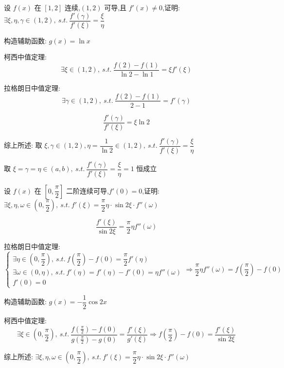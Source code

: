 \begin{proposition}
	设 $f(x)$ 在 $[1,2]$ 连续,$(1,2)$ 可导,且 $f'(x)\neq 0$,证明: $\exists \xi,\eta,\gamma\in(1,2),\ s.t.\ \dfrac{f'(\gamma)}{f'(\xi)}=\dfrac{\xi}{\eta}$
\end{proposition}
\begin{solution}

	构造辅助函数: $g(x)=\ln x$

	柯西中值定理:
	$$\exists\xi\in(1,2),\ s.t.\ \dfrac{f(2)-f(1)}{\ln 2-\ln 1}=\xi f'(\xi)$$

	拉格朗日中值定理:
	$$\exists\gamma\in(1,2),\ s.t.\ \dfrac{f(2)-f(1)}{2-1}=f'(\gamma)$$

	$$\dfrac{f'(\gamma)}{f'(\xi)}=\xi \ln 2$$

	综上所述: 取 $\xi,\gamma\in(1,2),\eta=\dfrac{1}{\ln2}\in(1,2),\ s.t.\ \dfrac{f'(\gamma)}{f'(\xi)}=\dfrac{\xi}{\eta}$
\end{solution}
\begin{anymark}[注]
	取 $\xi=\gamma=\eta\in(a,b),\ s.t.\ \dfrac{f'(\gamma)}{f'(\xi)}=\dfrac{\xi}{\eta} = 1$ 恒成立
\end{anymark}

\begin{proposition}
	设 $f(x)$ 在 $[0,\dfrac{\pi}{2}]$ 二阶连续可导,$f'(0)=0$,证明: $\exists \xi,\eta,\omega\in(0,\dfrac{\pi}{2}),\ s.t.\ f'(\xi)=\dfrac{\pi}{2}\eta\cdot \sin 2\xi\cdot f''(\omega)$
\end{proposition}
\begin{solution}

	$$\dfrac{f'(\xi)}{\sin 2\xi}=\dfrac{\pi}{2}\eta f''(\omega)$$

	拉格朗日中值定理:
	$$\begin{cases}
		\exists \eta\in(0,\dfrac{\pi}{2}),\ s.t.\ f(\dfrac{\pi}{2})-f(0)=\dfrac{\pi}{2}f'(\eta)\\
		\exists \omega\in(0,\eta),\ s.t.\ f'(\eta)=f'(\eta)-f'(0)=\eta f''(\omega)\\
		f'(0) = 0
	\end{cases}\Rightarrow \dfrac{\pi}{2}\eta f''(\omega) = f(\dfrac{\pi}{2}) - f(0)$$

	构造辅助函数: $g(x)=-\dfrac{1}{2}\cos 2x$

	柯西中值定理:
	$$\exists\xi\in(0,\dfrac{\pi}{2}),\ s.t.\ \dfrac{f(\frac{\pi}{2})-f(0)}{g(\frac{\pi}{2})-g(0)}=\dfrac{f'(\xi)}{g'(\xi)}\Rightarrow f(\frac{\pi}{2})-f(0)=\dfrac{f'(\xi)}{\sin 2\xi}$$

	综上所述: $\exists \xi,\eta,\omega\in(0,\dfrac{\pi}{2}),\ s.t.\ f'(\xi)=\dfrac{\pi}{2}\eta\cdot \sin 2\xi\cdot f''(\omega)$
\end{solution}

